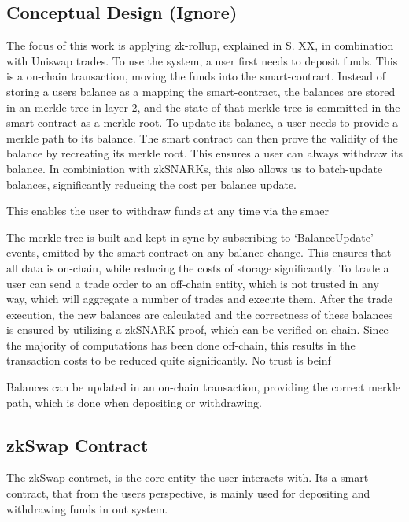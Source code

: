 \documentclass[../../thesis.tex]{subfiles}
\begin{document}
\subsection{Conceptual Design (Ignore)}
The focus of this work is applying zk-rollup, explained in S. XX, in combination with Uniswap trades. To use the system, a user first needs to deposit funds. This is a on-chain transaction, moving the funds into the smart-contract. Instead of storing a users balance as a mapping the smart-contract, the balances are stored in an merkle tree in layer-2, and the state of that merkle tree is committed in the smart-contract as a merkle root. To update its balance, a user needs to provide a merkle path to its balance. The smart contract can then prove the validity of the balance by recreating its merkle root. This ensures a user can always withdraw its balance. In combiniation with zkSNARKs, this also allows us to batch-update balances, significantly reducing the cost per balance update. 


This enables the user to withdraw funds at any time via the smaer


The merkle tree is built and kept in sync by subscribing to `BalanceUpdate' events, emitted by the smart-contract on any balance change. This ensures that all data is on-chain, while reducing the costs of storage significantly. To trade a user can send a trade order to an off-chain entity, which is not trusted in any way, which will aggregate a number of trades and execute them. After the trade execution, the new balances are calculated and the correctness of these balances is ensured by utilizing a zkSNARK proof, which can be verified on-chain. Since the majority of computations has been done off-chain, this results in the transaction costs to be reduced quite significantly. No trust is beinf

Balances can be updated in an on-chain transaction, providing the correct merkle path, which is done when depositing or withdrawing. 

\subsection{zkSwap Contract}
The zkSwap contract, is the core entity the user interacts with. Its a smart-contract, that from the users perspective, is mainly used for depositing and withdrawing funds in out system. 
\end{document}
